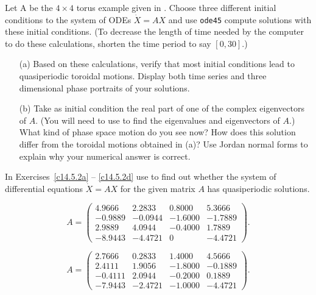 \documentclass{ximera}
\begin{document}
\begin{exercise}  \label{EX:tor4}
Let A be the $4\times 4$ torus example given in .  Choose three 
different initial conditions to the system of ODEs $\dot{X}=AX$ and use 
{\tt ode45} compute solutions with these initial conditions.  (To decrease 
the length of time needed by the computer to do these calculations, shorten 
the time period to say $[0,30]$.)  
\begin{itemize}
\item[(a)]  Based on these calculations, verify that most initial conditions 
lead to quasiperiodic toroidal motions.  Display both time series and 
three dimensional phase portraits of your solutions. 
\item[(b)]  Take as initial condition the real part of one of the complex
eigenvectors of $A$.  (You will need to use \Matlab to find the eigenvalues
and eigenvectors of $A$.)  What kind of phase space motion do you see now? 
How does this solution differ from the toroidal motions obtained in (a)? 
Use Jordan normal forms to explain why your numerical answer is correct.
\end{itemize}
\end{exercise} 

\noindent In Exercises~\ref{c14.5.2a} -- \ref{c14.5.2d} use \Matlab to find
out whether the system of differential equations $\dot X= AX$ for
the given matrix $A$ has quasiperiodic solutions.
\begin{exercise} \label{c14.5.2a}
\begin{equation*}
A=\left(\begin{array}{rrrr}
    4.9666  &  2.2833  &  0.8000  &  5.3666\\
   -0.9889  & -0.0944  & -1.6000  & -1.7889\\
    2.9889  &  4.0944  & -0.4000  &  1.7889\\
   -8.9443  & -4.4721  &       0  & -4.4721
\end{array}\right).
\end{equation*}
\end{exercise}

\begin{exercise} \label{c14.5.2b}
\begin{equation*}
A=\left(\begin{array}{rrrr}
    2.7666  &  0.2833  &  1.4000  &  4.5666\\
    2.4111  &  1.9056  & -1.8000  & -0.1889\\
   -0.4111  &  2.0944  & -0.2000  &  0.1889\\
   -7.9443  & -2.4721  & -1.0000  & -4.4721
\end{array}\right).
\end{equation*}
\end{exercise}
\end{document}
